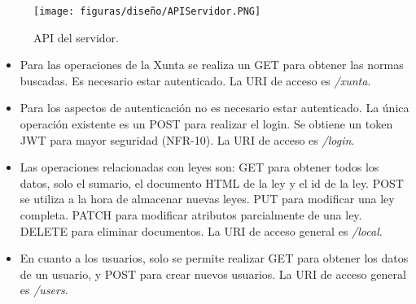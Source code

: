 \begin{figure}[H]
\centerline{\texttt{[image: figuras/diseño/APIServidor.PNG]}}
\caption{API del servidor.}
\label{enlaceAPIServidor}
\end{figure}

\begin{itemize}
    \item Para las operaciones de la Xunta se realiza un GET para obtener las normas buscadas. Es necesario estar autenticado. La URI de acceso es {\it /xunta}.
    \item Para los aspectos de autenticación no es necesario estar autenticado. La única operación existente es un POST para realizar el login. Se obtiene un token JWT \cite{jwt} para mayor seguridad (NFR-10). La URI de acceso es {\it /login}.
    \item Las operaciones relacionadas con leyes son: GET para obtener todos los datos, solo el sumario, el documento HTML de la ley y el id de la ley. POST se utiliza a la hora de almacenar nuevas leyes. PUT para modificar una ley completa. PATCH para modificar atributos parcialmente de una ley. DELETE para eliminar documentos. La URI de acceso general es {\it /local}.
    \item En cuanto a los usuarios, solo se permite realizar GET para obtener los datos de un usuario, y POST para crear nuevos usuarios. La URI de acceso general es {\it /users}.
\end{itemize}